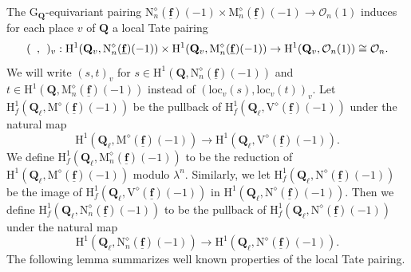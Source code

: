 \documentclass[10pt]{amsart}
\numberwithin{equation}{section}
\theoremstyle{plain}
\numberwithin{equation}{section}
\theoremstyle{definition}
\theoremstyle{remark}
\def\loc{\mathrm{loc}}
\def\triplef{\underline{\mathbf{f}}}
\def\calO{\mathcal{O}}
\def\QQ{\mathbf{Q}}
\def\rmG{\mathrm{G}}
\def\rmH{\mathrm{H}}
\def\rmM{\mathrm{M}}
\def\rmN{\mathrm{N}}
\def\rmV{\mathrm{V}}
\begin{document}
The $\rmG_{\QQ}$-equivariant pairing $\mathrm{N}^{\diamond}_{n}(\triplef)(-1)\times \rmM^{\diamond}_{n}(\triplef)(-1)\rightarrow \calO_{n}(1)$ induces for each place $v$ of $\QQ$ a local Tate pairing 
\begin{equation*}
(\hphantom{a}, \hphantom{b})_{v}: \rmH^{1}(\QQ_{v}, \rmN^{\diamond}_{n}(\triplef)(-1))\times \rmH^{1}(\QQ_{v},\rmM^{\diamond}_{n}(\triplef)(-1)) \rightarrow \rmH^{1}(\QQ_{v}, \calO_{n}(1))\cong \calO_{n}.
\end{equation*}
We will write $(s, t)_{v}$ for $s\in  \rmH^{1}(\QQ, \rmN^{\diamond}_{n}(\triplef)(-1))$ and $t\in  \rmH^{1}(\QQ,\rmM^{\diamond}_{n}(\triplef)(-1))$ instead of $(\loc_{v}(s), \loc_{v}(t))_{v}$.  Let $\rmH^{1}_{f}(\QQ_{\ell},\rmM^{\diamond}(\triplef)(-1))$ be the pullback of  $\rmH^{1}_{f}(\QQ_{\ell}, \rmV^{\diamond}(\triplef)(-1))$ under the natural map 
\begin{equation*}
\rmH^{1}(\QQ_{\ell},\rmM^{\diamond}(\triplef)(-1))\rightarrow \rmH^{1}(\QQ_{\ell}, \rmV^{\diamond}(\triplef)(-1)). 
\end{equation*}
We define $\rmH^{1}_{f}(\QQ_{\ell},\rmM^{\diamond}_{n}(\triplef)(-1))$ to be the reduction of $\rmH^{1}(\QQ_{\ell},\rmM^{\diamond}(\triplef)(-1))$ modulo $\lambda^{n}$. Similarly, we let $\rmH^{1}_{f}(\QQ_{\ell}, \rmN^{\diamond}(\triplef)(-1))$ be the image of $\rmH^{1}_{f}(\QQ_{\ell}, \rmV^{\diamond}(\triplef)(-1))$ in $\rmH^{1}(\QQ_{\ell}, \rmN^{\diamond}(\triplef)(-1))$. Then we define $\rmH^{1}_{f}(\QQ_{\ell}, \rmN^{\diamond}_{n}(\triplef)(-1))$ to be the pullback of $\rmH^{1}_{f}(\QQ_{\ell}, \rmN^{\diamond}(\triplef)(-1))$ under the natural map 
\begin{equation*}
\rmH^{1}(\QQ_{\ell}, \rmN^{\diamond}_{n}(\triplef)(-1))\rightarrow \rmH^{1}(\QQ_{\ell}, \rmN^{\diamond}(\triplef)(-1)).
\end{equation*}
The following lemma summarizes well known properties of the local Tate pairing.
\end{document}
